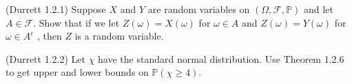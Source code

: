 \documentclass[12pt]{gradescopeexam}
\renewcommand\P{\mathbb{P}}
\renewcommand\c[1]{\mathcal{#1}}
\begin{document}
\makeheader
\vspace{0.1in}
\begin{questions}
  \begin{question}
    (Durrett 1.2.1) Suppose $X$ and $Y$ are random variables on
    $(\Omega, \c{F}, \P )$ and let $A \in \c{F}$.  Show that if we let
    $Z(\omega) = X(\omega)$ for $\omega \in A$ and
    $Z(\omega) = Y (\omega)$ for $\omega \in A^c$ , then $Z$ is a random
    variable.
  \end{question}

  \begin{question}
    (Durrett 1.2.2) Let $\chi$ have the standard normal
    distribution. Use Theorem 1.2.6 to get upper and lower bounds on
    $\P (\chi \ge 4)$.
\end{question}
\end{questions}
\end{document}
